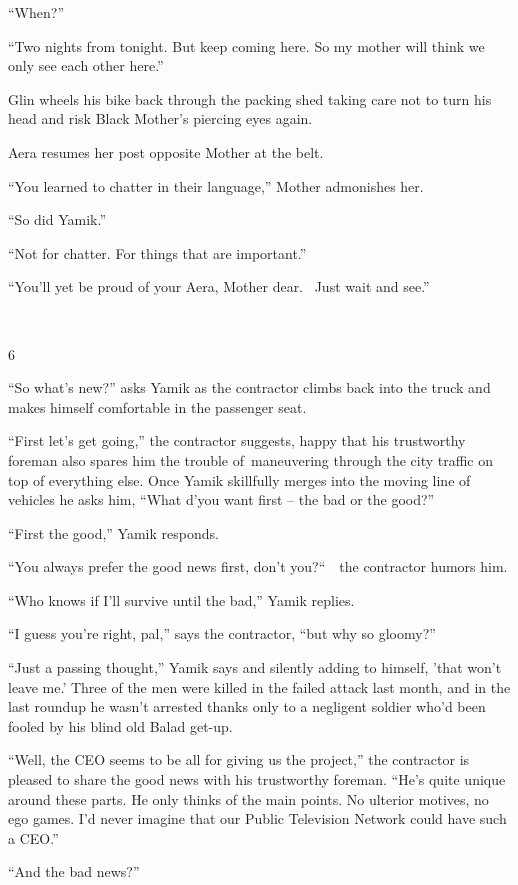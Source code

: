 \documentclass[twoside,11pt]{book}
\begin{document}
``When?''

``Two nights from tonight. But keep coming here. So my mother will think we only see each other
here.''

Glin wheels his bike back through the packing shed taking care not to turn his head and risk Black Mother's piercing
eyes again.

Aera resumes her post opposite Mother at the belt. 

``You learned to chatter in their language,'' Mother admonishes her.

``So did Yamik.''

``Not for chatter. For things that are important.''

``You'll yet be proud of your Aera, Mother dear.~ Just wait and see.''

~

6 

``So what's new?'' asks Yamik as the contractor climbs back into the truck and makes himself
comfortable in the passenger seat. 

``First let's get going,'' the contractor suggests, happy that his trustworthy foreman also
spares him the trouble of\ maneuvering through the city traffic on top of everything else. Once Yamik skillfully merges
into the moving line of vehicles he asks him, ``What d'you want first -- the bad or the
good?'' 

``First the good,'' Yamik responds. 

``You always prefer the good news first, don't you?``\ \ the contractor humors him. 

``Who knows if I'll survive until the bad,'' Yamik replies.{\ }

``I guess you're right, pal,'' says the contractor, ``but why so
gloomy?'' 

``Just a passing thought,'' Yamik says and silently adding to himself, 'that won't leave me.'
Three of the men were killed in the failed attack last month, and in the last roundup he wasn't arrested thanks only to
a negligent soldier who'd been fooled by his blind old Balad get-up. 

``Well, the CEO seems to be all for giving us the project,'' the contractor is pleased to
share the good news with his trustworthy foreman. ``He's quite unique around these parts. He only thinks
of the main points. No ulterior motives, no ego games. I'd never imagine that our Public Television Network could have
such a CEO.''

``And the bad news?'' 
\end{document}
